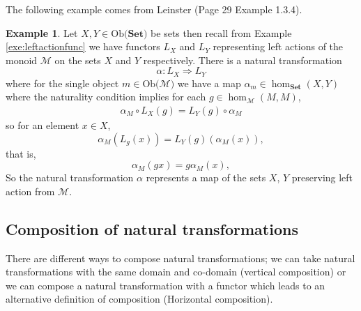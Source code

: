 \documentclass[11pt,a4paper]{article}
\theoremstyle{definition}
\newtheorem{example}[thm]{Example}
\newcommand\ho[3][]{\hom_{#1}(#2,#3)}
\newcommand\ob[1]{\mathrm{Ob(}#1\mathrm{)}}
\newcommand\cat[1]{\mathscr{#1}}
\newcommand\nattran[3]{#1\colon#2\Rightarrow#3}
\numberwithin{equation}{section}
\begin{document}
The following example comes from Leinster \cite{Leinster} (Page 29 Example 1.3.4).
\begin{example}
    \label{exe:nattranleftaction}
    Let $X,Y\in\ob{\mathbf{Set}}$ be sets then recall from Example \ref{exe:leftactionfunc} we have functors $L_{X}$ and $L_{Y}$ representing left actions of the monoid $\cat{M}$ on the sets $X$ and $Y$ respectively. There is a natural transformation 
    \[\nattran{\alpha}{L_{X}}{L_{Y}}\]
    where for the single object $m\in\ob{\cat{M}}$ we have a map $\alpha_{m}\in\ho[\mathbf{Set}]{X}{Y}$ where the naturality condition implies for each $g\in\ho[\cat{M}]{M}{M}$,
    \begin{align*}
        \alpha_{M} \circ L_{X}(g) = L_{Y}(g)\circ \alpha_{M}
    \end{align*}
    so for an element $x\in X$,
    \[\alpha_{M}(L_{g}(x)) = L_{Y}(g)(\alpha_{M}(x)),\]
    that is,
    \[\alpha_M(gx) = g\alpha_{M}(x),\]
    So the natural transformation $\alpha$ represents a map of the sets $X$, $Y$ preserving left action from $\cat{M}$.
\end{example}
\subsection{Composition of natural transformations}
\label{ss:compnaturaltransformations} 
There are different ways to compose natural transformations; we can take natural transformations with the same domain and co-domain (vertical composition) or we can compose a natural transformation with a functor which leads to an alternative definition of composition (Horizontal composition). 
\end{document}
